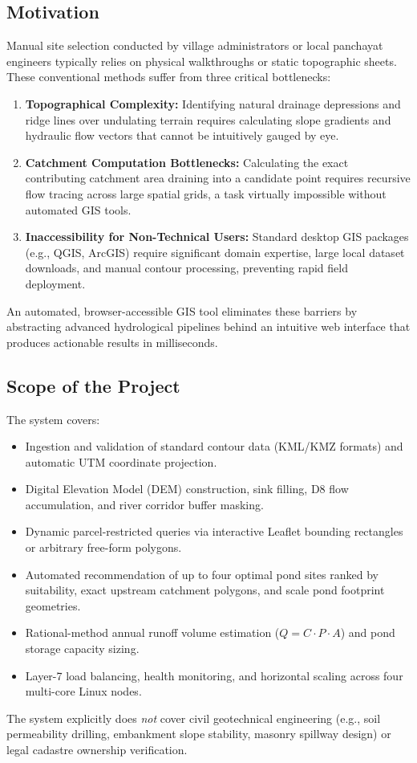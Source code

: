 \documentclass[manuscript,screen,review]{acmart}
\begin{document}
\subsection{Motivation}
Manual site selection conducted by village administrators or local panchayat engineers typically relies on physical walkthroughs or static topographic sheets. These conventional methods suffer from three critical bottlenecks:
\begin{enumerate}
    \item \textbf{Topographical Complexity:} Identifying natural drainage depressions and ridge lines over undulating terrain requires calculating slope gradients and hydraulic flow vectors that cannot be intuitively gauged by eye.
    \item \textbf{Catchment Computation Bottlenecks:} Calculating the exact contributing catchment area draining into a candidate point requires recursive flow tracing across large spatial grids, a task virtually impossible without automated GIS tools.
    \item \textbf{Inaccessibility for Non-Technical Users:} Standard desktop GIS packages (e.g., QGIS, ArcGIS) require significant domain expertise, large local dataset downloads, and manual contour processing, preventing rapid field deployment.
\end{enumerate}
An automated, browser-accessible GIS tool eliminates these barriers by abstracting advanced hydrological pipelines behind an intuitive web interface that produces actionable results in milliseconds.

\subsection{Scope of the Project}
The system covers:
\begin{itemize}
    \item Ingestion and validation of standard contour data (KML/KMZ formats) and automatic UTM coordinate projection.
    \item Digital Elevation Model (DEM) construction, sink filling, D8 flow accumulation, and river corridor buffer masking.
    \item Dynamic parcel-restricted queries via interactive Leaflet bounding rectangles or arbitrary free-form polygons.
    \item Automated recommendation of up to four optimal pond sites ranked by suitability, exact upstream catchment polygons, and scale pond footprint geometries.
    \item Rational-method annual runoff volume estimation ($Q = C \cdot P \cdot A$) and pond storage capacity sizing.
    \item Layer-7 load balancing, health monitoring, and horizontal scaling across four multi-core Linux nodes.
\end{itemize}
The system explicitly does \emph{not} cover civil geotechnical engineering (e.g., soil permeability drilling, embankment slope stability, masonry spillway design) or legal cadastre ownership verification.
\end{document}
